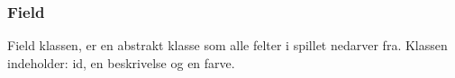 \subsubsection{Field}
Field klassen, er en abstrakt klasse som alle felter i spillet nedarver fra. Klassen indeholder: id, en beskrivelse og en farve. 